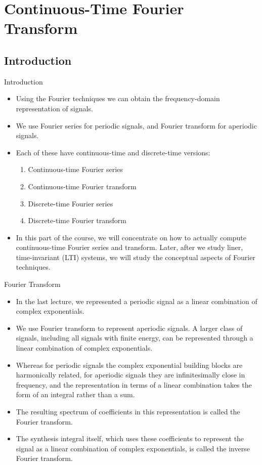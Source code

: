\section{Continuous-Time Fourier Transform}

\subsection{Introduction}
\begin{frame}{Introduction}
    \begin{itemize}[<+->]
      \item Using the Fourier techniques we can obtain the frequency-domain representation of signals.
      \item We use Fourier series for periodic signals, and Fourier transform for aperiodic signals.
      \item Each of these have continuous-time and discrete-time versions:
        \begin{enumerate}
            \item Continuous-time Fourier series
            \item Continuous-time Fourier transform
            \item Discrete-time Fourier series
            \item Discrete-time Fourier transform
        \end{enumerate}
      \item In this part of the course, we will concentrate on how to actually compute continuous-time Fourier series and transform. Later, after we study liner, time-invariant (LTI) systems, we will study the conceptual aspects of Fourier techniques.
    \end{itemize}
\end{frame}

\begin{frame}{Fourier Transform}
    \begin{itemize}[<+->]
          \item In the last lecture, we represented a periodic signal as a linear combination of complex exponentials.
          \item We use Fourier transform to represent aperiodic signals. A larger class of signals, including all signals with finite energy, can be represented through a linear combination of complex exponentials.
          \item Whereas for periodic signals the complex exponential building blocks are harmonically related, for aperiodic signals they are infinitesimally close in frequency, and the representation in terms of a linear combination takes the form of an integral rather than a sum.
          \item The resulting spectrum of coefficients in this representation is called the Fourier transform.
          \item The synthesis integral itself, which uses these coefficients to represent the signal as a linear combination of complex exponentials, is called the inverse Fourier transform.
      \end{itemize}
\end{frame}


